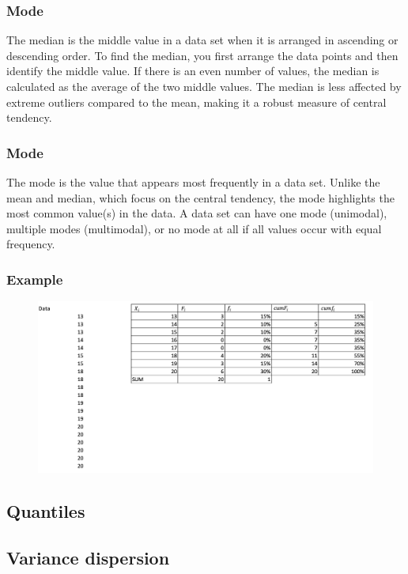 \documentclass[a4paper,10pt,onecolumn]{article}
\begin{document}
\subsubsection{Mode}
The median is the middle value in a data set when it is arranged in ascending or descending order. To find the median, you first arrange the data points and then identify the middle value. If there is an even number of values, the median is calculated as the average of the two middle values. The median is less affected by extreme outliers compared to the mean, making it a robust measure of central tendency.
\subsubsection{Mode}
The mode is the value that appears most frequently in a data set. Unlike the mean and median, which focus on the central tendency, the mode highlights the most common value(s) in the data. A data set can have one mode (unimodal), multiple modes (multimodal), or no mode at all if all values occur with equal frequency.
\\
\subsubsection{Example}
\begin{figure}[h]
    \centering
    \includegraphics[width=\textwidth]{mmm.png}    
\end{figure}
\subsection{Quantiles}
\subsection{Variance dispersion}


  
\end{document}
